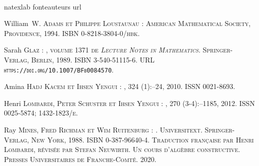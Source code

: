 \small
~

\begin{thebibliography}{8}
\expandafter\ifx\csname natexlab\endcsname\relax\def\natexlab#1{#1}\fi
\expandafter\ifx\csname fonteauteurs\endcsname\relax
\def\fonteauteurs{\scshape}\fi
\expandafter\ifx\csname url\endcsname\relax
  \def\url#1{{\tt #1}}%
    \fi

William~W. \bgroup\fonteauteurs\bgroup {Adams}\egroup\egroup{} et Philippe
  \bgroup\fonteauteurs\bgroup {Loustaunau}\egroup\egroup{} :
\newblock American Mathematical Society, Providence, 1994.
\newblock ISBN 0-8218-3804-0/hbk.

Sarah \bgroup\fonteauteurs\bgroup Glaz\egroup\egroup{} :
, volume 1371 de {\em Lecture Notes
  in Mathematics}.
\newblock Springer-Verlag, Berlin, 1989.
\newblock ISBN 3-540-51115-6.
\newblock URL \url{https://doi.org/10.1007/BFb0084570}.

Amina \bgroup\fonteauteurs\bgroup {Hadj Kacem}\egroup\egroup{} et Ihsen
  \bgroup\fonteauteurs\bgroup {Yengui}\egroup\egroup{} :
, 324 (1)\string:--24,
  2010.
\newblock ISSN 0021-8693.

Henri \bgroup\fonteauteurs\bgroup {Lombardi}\egroup\egroup{}, Peter
  \bgroup\fonteauteurs\bgroup {Schuster}\egroup\egroup{} et Ihsen
  \bgroup\fonteauteurs\bgroup {Yengui}\egroup\egroup{} :
, 270 (3-4)\string:--1185, 2012.
\newblock ISSN 0025-5874; 1432-1823/e.

Ray \bgroup\fonteauteurs\bgroup Mines\egroup\egroup{}, Fred
  \bgroup\fonteauteurs\bgroup Richman\egroup\egroup{} et Wim
  \bgroup\fonteauteurs\bgroup Ruitenburg\egroup\egroup{} :
.
\newblock Universitext. Springer-Verlag, New York, 1988.
\newblock ISBN 0-387-96640-4.
\newblock Traduction française par Henri Lombardi, révisée par Stefan
  Neuwirth. Un cours d'algèbre constructive. Presses Universitaires de
  Franche-Comté. 2020.


\end{thebibliography}
